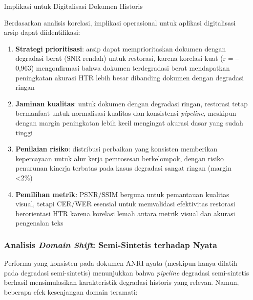 \documentclass[12pt,a4paper]{article}
\begin{document}
Implikasi untuk Digitalisasi Dokumen Historis

Berdasarkan analisis korelasi, implikasi operasional untuk aplikasi digitalisasi arsip dapat diidentifikasi:

\begin{enumerate}[nosep]
    \item \textbf{Strategi prioritisasi}: arsip dapat memprioritaskan dokumen dengan degradasi berat (SNR rendah) untuk restorasi, karena korelasi kuat (r = --0,963) mengonfirmasi bahwa dokumen terdegradasi berat mendapatkan peningkatan akurasi HTR lebih besar dibanding dokumen dengan degradasi ringan
    \item \textbf{Jaminan kualitas}: untuk dokumen dengan degradasi ringan, restorasi tetap bermanfaat untuk normalisasi kualitas dan konsistensi \textit{pipeline}, meskipun dengan margin peningkatan lebih kecil mengingat akurasi dasar yang sudah tinggi
    \item \textbf{Penilaian risiko}: distribusi perbaikan yang konsisten memberikan kepercayaan untuk alur kerja pemrosesan berkelompok, dengan risiko penurunan kinerja terbatas pada kasus degradasi sangat ringan (margin <2\%)
    \item \textbf{Pemilihan metrik}: PSNR/SSIM berguna untuk pemantauan kualitas visual, tetapi CER/WER esensial untuk memvalidasi efektivitas restorasi berorientasi HTR karena korelasi lemah antara metrik visual dan akurasi pengenalan teks
\end{enumerate}

\vspace{0.8em}

\subsubsection{Analisis \textit{Domain Shift}: Semi-Sintetis terhadap Nyata}
\label{subsubsec:anri-domain-shift}

Performa yang konsisten pada dokumen ANRI nyata (meskipun hanya dilatih pada degradasi semi-sintetis) menunjukkan bahwa \textit{pipeline} degradasi semi-sintetis berhasil mensimulasikan karakteristik degradasi historis yang relevan. Namun, beberapa efek kesenjangan domain teramati:
\end{document}
